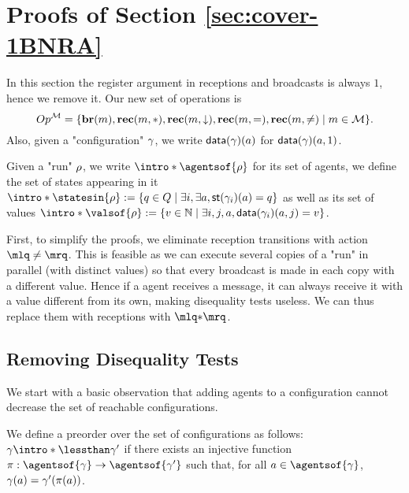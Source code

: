 
\section{Proofs of Section \ref{sec:cover-1BNRA}}
\label{app:cover-one-reg}

In this section the register argument in receptions and broadcasts is always $1$, hence we remove it.
Our new set of operations is 
\[
Op^{\mathcal{M}} = \{\textbf{br}(m), \textbf{rec}(m, {*}), \textbf{rec}(m, \downarrow), \textbf{rec}(m, {=}), \textbf{rec}(m, {\ne}) \mid m \in \mathcal{M}\}.
\]
Also, given a "configuration" $\gamma$, we write $\mathsf{data}(\gamma)(a)$ for $\mathsf{data}(\gamma)(a,1)$. 

Given a "run" $\rho$, we write $\intro*\agentsof{\run}$ for its set of agents, we define the set of states appearing in it $\intro*\statesin{\run}:= \set{q \in Q \mid \exists i, \exists a, \st{\config_i}(a) = q}$  as well as its set of values $\intro*\valsof{\run} := \set{\aval \in \nats \mid \exists i,j, a, \data{\config_i}(a,j) = \aval}$.  

First, to simplify the proofs, we eliminate reception transitions with action $\quotemarks{\ne}$. This is feasible as we can execute several copies of a "run" in parallel (with distinct values) so that every broadcast is made in each copy with a different value. Hence if a agent receives a message, it can always receive it with a value different from its own, making disequality tests useless. We can thus replace them with receptions with $\quotemarks{\dummyact}$. 




\subsection{Removing Disequality Tests}
\label{sec:one-diseq-tests}

We start with a basic observation that adding agents to a configuration cannot decrease the set of reachable configurations.


\begin{definition}
	We define a preorder over the set of configurations as follows: $\config \intro*\lessthan \config'$ if there exists an injective function $\pi: \agentsof{\config} \rightarrow \agentsof{\config'}$ such that, for all $a \in \agentsof{\config}$, $\gamma(a) = \gamma'(\pi(a))$. 
\end{definition}


